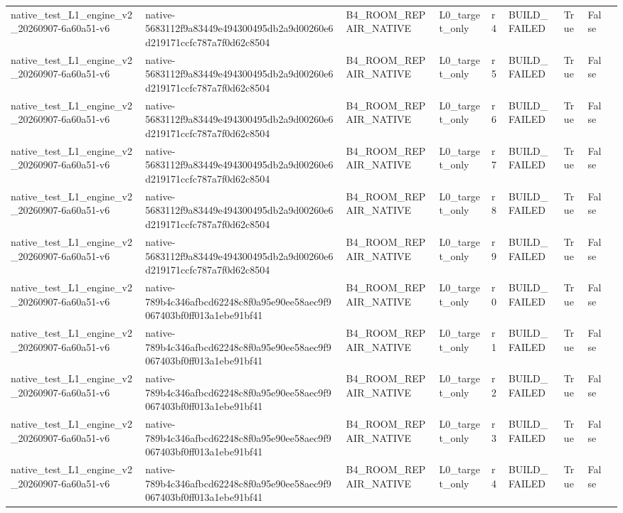 \begin{tabular}{lllllllll}
native\_test\_L1\_engine\_v2\_20260907-6a60a51-v6 & native-5683112f9a83449e494300495db2a9d00260e6d219171ccfc787a7f0d62c8504 & B4\_ROOM\_REPAIR\_NATIVE & L0\_target\_only & r4 & BUILD\_FAILED & True & False &  \\
native\_test\_L1\_engine\_v2\_20260907-6a60a51-v6 & native-5683112f9a83449e494300495db2a9d00260e6d219171ccfc787a7f0d62c8504 & B4\_ROOM\_REPAIR\_NATIVE & L0\_target\_only & r5 & BUILD\_FAILED & True & False &  \\
native\_test\_L1\_engine\_v2\_20260907-6a60a51-v6 & native-5683112f9a83449e494300495db2a9d00260e6d219171ccfc787a7f0d62c8504 & B4\_ROOM\_REPAIR\_NATIVE & L0\_target\_only & r6 & BUILD\_FAILED & True & False &  \\
native\_test\_L1\_engine\_v2\_20260907-6a60a51-v6 & native-5683112f9a83449e494300495db2a9d00260e6d219171ccfc787a7f0d62c8504 & B4\_ROOM\_REPAIR\_NATIVE & L0\_target\_only & r7 & BUILD\_FAILED & True & False &  \\
native\_test\_L1\_engine\_v2\_20260907-6a60a51-v6 & native-5683112f9a83449e494300495db2a9d00260e6d219171ccfc787a7f0d62c8504 & B4\_ROOM\_REPAIR\_NATIVE & L0\_target\_only & r8 & BUILD\_FAILED & True & False &  \\
native\_test\_L1\_engine\_v2\_20260907-6a60a51-v6 & native-5683112f9a83449e494300495db2a9d00260e6d219171ccfc787a7f0d62c8504 & B4\_ROOM\_REPAIR\_NATIVE & L0\_target\_only & r9 & BUILD\_FAILED & True & False &  \\
native\_test\_L1\_engine\_v2\_20260907-6a60a51-v6 & native-789b4c346afbcd62248c8f0a95e90ee58aec9f9067403bf0ff013a1ebe91bf41 & B4\_ROOM\_REPAIR\_NATIVE & L0\_target\_only & r0 & BUILD\_FAILED & True & False &  \\
native\_test\_L1\_engine\_v2\_20260907-6a60a51-v6 & native-789b4c346afbcd62248c8f0a95e90ee58aec9f9067403bf0ff013a1ebe91bf41 & B4\_ROOM\_REPAIR\_NATIVE & L0\_target\_only & r1 & BUILD\_FAILED & True & False &  \\
native\_test\_L1\_engine\_v2\_20260907-6a60a51-v6 & native-789b4c346afbcd62248c8f0a95e90ee58aec9f9067403bf0ff013a1ebe91bf41 & B4\_ROOM\_REPAIR\_NATIVE & L0\_target\_only & r2 & BUILD\_FAILED & True & False &  \\
native\_test\_L1\_engine\_v2\_20260907-6a60a51-v6 & native-789b4c346afbcd62248c8f0a95e90ee58aec9f9067403bf0ff013a1ebe91bf41 & B4\_ROOM\_REPAIR\_NATIVE & L0\_target\_only & r3 & BUILD\_FAILED & True & False &  \\
native\_test\_L1\_engine\_v2\_20260907-6a60a51-v6 & native-789b4c346afbcd62248c8f0a95e90ee58aec9f9067403bf0ff013a1ebe91bf41 & B4\_ROOM\_REPAIR\_NATIVE & L0\_target\_only & r4 & BUILD\_FAILED & True & False &  \\

\end{tabular}
